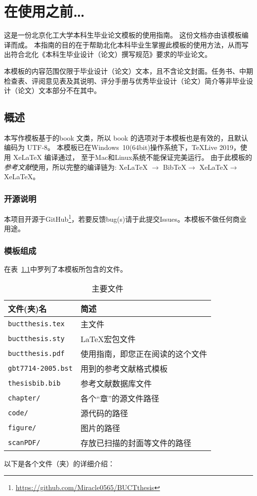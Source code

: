 \chapter{在使用之前\ldots}
这是一份北京化工大学本科生毕业论文模板的使用指南。
这份文档亦由该模板编译而成。
本指南的目的在于帮助北化本科毕业生掌握此模板的使用方法，从而写出符合北化《本科生毕业设计（论文）撰写规范》要求的毕业论文。

本模板的内容范围仅限于毕业设计（论文）文本，且不含论文封面。任务书、中期检查表、评阅意见表及其说明、评分手册与优秀毕业设计（论文）简介等非毕业设计（论文）文本部分不在其中。

	\section{概述}
	本写作模板基于\CTeX{}的book 文类，所以 book 的选项对于本模板也是有效的，且默认编码为 UTF-8。
	本模板已在Windows\ 10(64bit)操作系统下，\TeX{}Live 2019，使用 XeLaTeX 编译通过，
	至于Mac和Linux系统不能保证完美运行。
	由于此模板的\emph{参考文献}使用\BibTeX{}，所以完整的编译链为:
	XeLaTeX $\rightarrow$ BibTeX{}$\rightarrow$ XeLaTeX{}$\rightarrow$ XeLaTeX{}。
		\subsection{开源说明}
			本项目开源于GitHub\footnote{\url{https://github.com/Miracle0565/BUCTthesis}}，若要反馈bug(s)请于此提交Issues。本模板不做任何商业用途。
		\subsection{模板组成}
		在表~\ref{tab:mainfile}中罗列了本模板所包含的文件。
		\begin{table}%
			\centering
			\caption{主要文件}
			\label{tab:mainfile}
			\begin{tabular}{ll}
				\hline 
				文件(夹)名 & 简述 \\ 
				\hline 
				\texttt{buctthesis.tex} & 主文件 \\
				\texttt{buctthesis.sty} & \LaTeX{}宏包文件\\
				\texttt{buctthesis.pdf} & 使用指南，即您正在阅读的这个文件\\
				\texttt{gbt7714-2005.bst} & \BibTeX{}用到的参考文献格式模板\\
				\texttt{thesisbib.bib}		& \BibTeX{}参考文献数据库文件\\
				\texttt{chapter/} & 各个“章”的源文件路径\\
				\texttt{code/} & 源代码的路径\\
				\texttt{figure/} & 图片的路径\\
				\texttt{scanPDF/} & 存放已扫描的封面等文件的路径\\
				\hline 
			\end{tabular} 
		\end{table}
		以下是各个文件（夹）的详细介绍：
